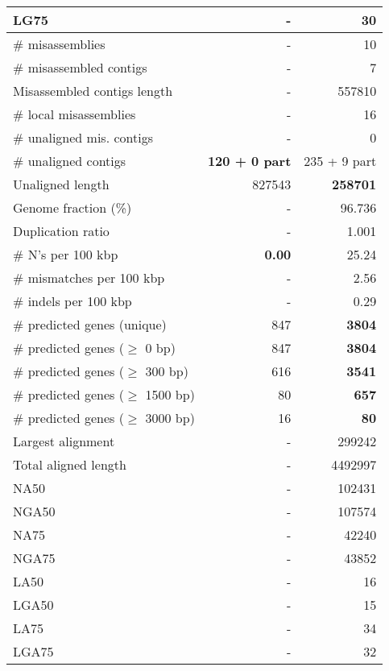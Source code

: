 \documentclass[12pt,a4paper]{article}
\begin{document}
\begin{table}[ht]
\begin{center}
\begin{tabular}{|l*{2}{|r}|}
LG75 & - & 30 \\ \hline
\# misassemblies & - & 10 \\ \hline
\# misassembled contigs & - & 7 \\ \hline
Misassembled contigs length & - & 557810 \\ \hline
\# local misassemblies & - & 16 \\ \hline
\# unaligned mis. contigs & - & 0 \\ \hline
\# unaligned contigs & {\bf 120 + 0 part} & 235 + 9 part \\ \hline
Unaligned length & 827543 & {\bf 258701} \\ \hline
Genome fraction (\%) & - & 96.736 \\ \hline
Duplication ratio & - & 1.001 \\ \hline
\# N's per 100 kbp & {\bf 0.00} & 25.24 \\ \hline
\# mismatches per 100 kbp & - & 2.56 \\ \hline
\# indels per 100 kbp & - & 0.29 \\ \hline
\# predicted genes (unique) & 847 & {\bf 3804} \\ \hline
\# predicted genes ($\geq$ 0 bp) & 847 & {\bf 3804} \\ \hline
\# predicted genes ($\geq$ 300 bp) & 616 & {\bf 3541} \\ \hline
\# predicted genes ($\geq$ 1500 bp) & 80 & {\bf 657} \\ \hline
\# predicted genes ($\geq$ 3000 bp) & 16 & {\bf 80} \\ \hline
Largest alignment & - & 299242 \\ \hline
Total aligned length & - & 4492997 \\ \hline
NA50 & - & 102431 \\ \hline
NGA50 & - & 107574 \\ \hline
NA75 & - & 42240 \\ \hline
NGA75 & - & 43852 \\ \hline
LA50 & - & 16 \\ \hline
LGA50 & - & 15 \\ \hline
LA75 & - & 34 \\ \hline
LGA75 & - & 32 \\ \hline
\end{tabular}
\end{center}
\end{table}
\end{document}
